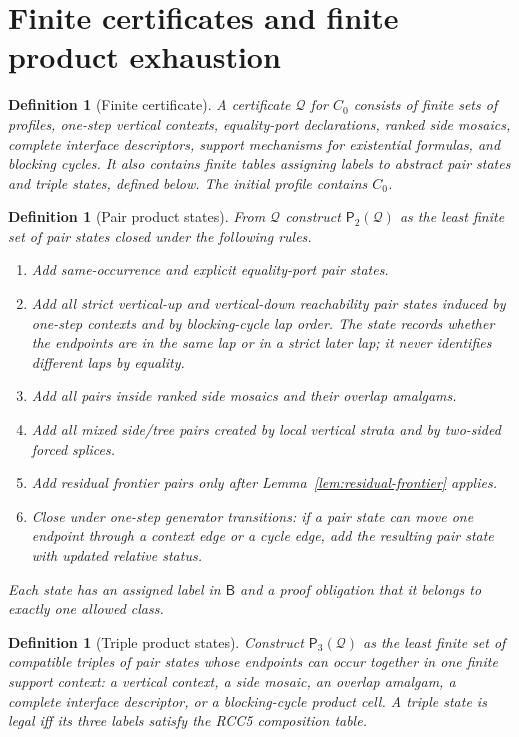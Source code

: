 \documentclass[11pt]{article}
\newtheorem{definition}[theorem]{Definition}
\newcommand{\B}{\mathsf B}
\newcommand{\Q}{\mathcal Q}
\newcommand{\Pairs}{\mathsf{P}_2}
\newcommand{\Triples}{\mathsf{P}_3}
\begin{document}
\section{Finite certificates and finite product exhaustion}

\begin{definition}[Finite certificate]
A certificate $\Q$ for $C_0$ consists of finite sets of profiles, one-step vertical contexts, equality-port declarations, ranked side mosaics, complete interface descriptors, support mechanisms for existential formulas, and blocking cycles.  It also contains finite tables assigning labels to abstract pair states and triple states, defined below.  The initial profile contains $C_0$.
\end{definition}

\begin{definition}[Pair product states]
From $\Q$ construct $\Pairs(\Q)$ as the least finite set of pair states closed under the following rules.
\begin{enumerate}[label=(P\arabic*)]
\item Add same-occurrence and explicit equality-port pair states.
\item Add all strict vertical-up and vertical-down reachability pair states induced by one-step contexts and by blocking-cycle lap order.  The state records whether the endpoints are in the same lap or in a strict later lap; it never identifies different laps by equality.
\item Add all pairs inside ranked side mosaics and their overlap amalgams.
\item Add all mixed side/tree pairs created by local vertical strata and by two-sided forced splices.
\item Add residual frontier pairs only after Lemma~\ref{lem:residual-frontier} applies.
\item Close under one-step generator transitions: if a pair state can move one endpoint through a context edge or a cycle edge, add the resulting pair state with updated relative status.
\end{enumerate}
Each state has an assigned label in $\B$ and a proof obligation that it belongs to exactly one allowed class.
\end{definition}

\begin{definition}[Triple product states]
Construct $\Triples(\Q)$ as the least finite set of compatible triples of pair states whose endpoints can occur together in one finite support context: a vertical context, a side mosaic, an overlap amalgam, a complete interface descriptor, or a blocking-cycle product cell.  A triple state is legal iff its three labels satisfy the RCC5 composition table.
\end{definition}
\end{document}
